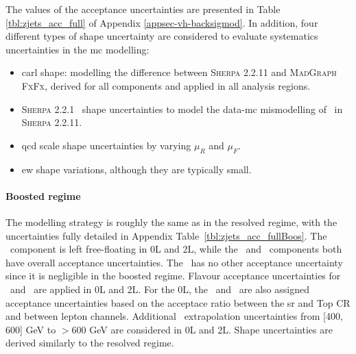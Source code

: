 The values of the acceptance uncertainties are presented in Table \ref{tbl:zjets_acc_full} of Appendix \ref{appsec-vh-backsigmod}. In addition, four different types of shape uncertainty are considered to evaluate systematics uncertainties in the \gls{mc} modelling:
\begin{itemize}
    \item \gls{carl} shape: modelling the difference between \textsc{Sherpa} 2.2.11 and \textsc{MadGraph FxFx}, derived for all components and applied in all analysis regions.
    \item \textsc{Sherpa} 2.2.1 \ptv\ shape uncertainties to model the data-\gls{mc} mismodelling of \ptv\ in \textsc{Sherpa} 2.2.11. 
    \item \gls{qcd} scale shape uncertainties by varying $\mu_R$ and $\mu_F$.
    \item \gls{ew} shape variations, although they are typically small.
\end{itemize} 

\paragraph{Boosted regime} The modelling strategy is roughly the same as in the resolved regime, with the uncertainties fully detailed in Appendix Table~\ref{tbl:zjets_acc_fullBoos}. The \zhf\ component is left free-floating in 0L and 2L, while the \zmf\ and \zlf\ components both have overall acceptance uncertainties. The \zlf\ has no other acceptance uncertainty since it is negligible in the boosted regime. Flavour acceptance uncertainties for \zhf\ and \zmf\ are applied in 0L and 2L. For the 0L, the \zhf\ and \zmf\ are also assigned acceptance uncertainties based on the acceptace ratio between the \gls{sr} and Top CR and between lepton channels. Additional \ptv\ extrapolation uncertainties from [400, 600] GeV to $> 600$ GeV are considered in 0L and 2L. Shape uncertainties are derived similarly to the resolved regime. 

